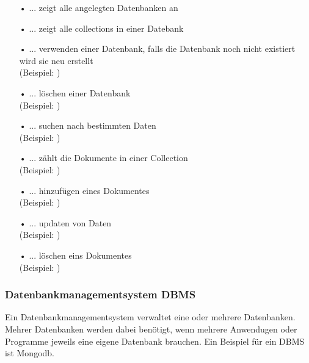 \begin{itemize} 
\item[•] \textbf{} ... zeigt alle angelegten Datenbanken an
\item[•] \textbf{} ... zeigt alle collections in einer Datebank
\item[•] \textbf{} ... verwenden einer Datenbank, falls die Datenbank noch nicht existiert wird sie neu erstellt 
\\     (Beispiel:  )
\item[•] \textbf{} ... löschen einer Datenbank
\\     (Beispiel:  )
\item[•] \textbf{} ... suchen nach bestimmten Daten 
\\     (Beispiel:  )
\item[•] \textbf{} ... zählt die Dokumente in einer Collection
\\     (Beispiel:  )
\item[•] \textbf{} ... hinzufügen eines Dokumentes
\\     (Beispiel:  )
\item[•] \textbf{} ... updaten von Daten
\\     (Beispiel:  )
\item[•] \textbf{} ... löschen eins Dokumentes
\\     (Beispiel:  )
\end{itemize}

\subsubsection{Datenbankmanagementsystem DBMS}
Ein Datenbankmanagementsystem verwaltet eine oder mehrere Datenbanken. Mehrer Datenbanken werden dabei benötigt, wenn mehrere Anwendugen oder Programme jeweils eine eigene Datenbank brauchen. Ein Beispiel für ein DBMS ist Mongodb.

